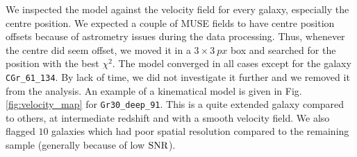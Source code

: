We inspected the model against the velocity field for every galaxy, especially the centre position. We expected a couple of MUSE fields to have centre position offsets because of astrometry issues during the data processing. Thus, whenever the centre did seem offset, we moved it in a $3\times \SI{3}{px}$ box and searched for the position with the best $\chi^2$. The model converged in all cases except for the galaxy \texttt{CGr\_61\_134}. By lack of time, we did not investigate it further and we removed it from the analysis. An example of a kinematical model is given in Fig.\,\ref{fig:velocity_map} for \texttt{Gr30\_deep\_91}. This is a quite extended galaxy compared to others, at intermediate redshift and with a smooth velocity field. We also flagged $10$ galaxies which had poor spatial resolution compared to the remaining sample (generally because of low $\rm{SNR}$).